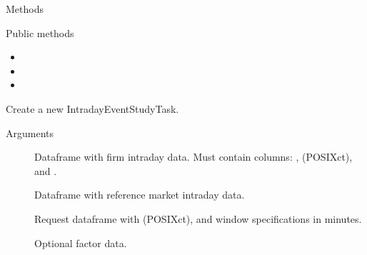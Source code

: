 \documentclass[a4paper]{book}
\begin{document}
\begin{Section}{Methods}
%
\begin{SubSection}{Public methods}
\begin{itemize}

\item{} 
\item{} 
\item{} 

\end{itemize}

\end{SubSection}




\hypertarget{method-IntradayEventStudyTask-initialize}{}
%
\begin{SubSection}{}
Create a new IntradayEventStudyTask.
%

%
\begin{SubSubSection}{Arguments}

\begin{description}

\item[] Dataframe with firm intraday data.
Must contain columns: ,  (POSIXct),
and .
\item[] Dataframe with reference market intraday data.
\item[] Request dataframe with 
(POSIXct), and window specifications in minutes.
\item[] Optional factor data.

\end{description}



\end{SubSubSection}


\end{SubSection}
\end{Section}
\end{document}
